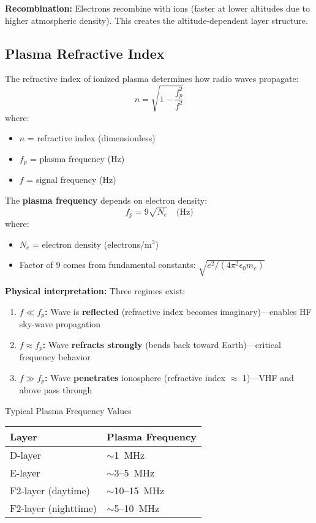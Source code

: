 \textbf{Recombination:} Electrons recombine with ions (faster at lower altitudes due to higher atmospheric density). This creates the altitude-dependent layer structure.

\subsection{Plasma Refractive Index}

The refractive index of ionized plasma determines how radio waves propagate:
\begin{equation}
n = \sqrt{1 - \frac{f_p^2}{f^2}}
\end{equation}
where:
\begin{itemize}
\item $n$ = refractive index (dimensionless)
\item $f_p$ = plasma frequency (Hz)
\item $f$ = signal frequency (Hz)
\end{itemize}

The \textbf{plasma frequency} depends on electron density:
\begin{equation}
f_p = 9\sqrt{N_e} \quad \text{(Hz)}
\end{equation}
where:
\begin{itemize}
\item $N_e$ = electron density (electrons/m$^3$)
\item Factor of 9 comes from fundamental constants: $\sqrt{e^2/(4\pi^2 \epsilon_0 m_e)}$
\end{itemize}

\textbf{Physical interpretation:} Three regimes exist:

\begin{enumerate}
\item \textbf{$f \ll f_p$:} Wave is \textbf{reflected} (refractive index becomes imaginary)---enables HF sky-wave propagation
\item \textbf{$f \approx f_p$:} Wave \textbf{refracts strongly} (bends back toward Earth)---critical frequency behavior
\item \textbf{$f \gg f_p$:} Wave \textbf{penetrates} ionosphere (refractive index $\approx$ 1)---VHF and above pass through
\end{enumerate}

\begin{calloutbox}{Typical Plasma Frequency Values}
\begin{tabular}{@{}ll@{}}
\toprule
Layer & Plasma Frequency \\
\midrule
D-layer & $\sim$1~MHz \\
E-layer & $\sim$3--5~MHz \\
F2-layer (daytime) & $\sim$10--15~MHz \\
F2-layer (nighttime) & $\sim$5--10~MHz \\
\bottomrule
\end{tabular}
\end{calloutbox}

